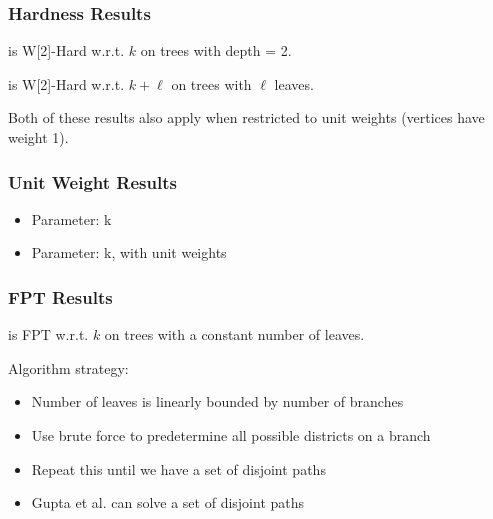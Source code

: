 \begin{frame}
    \frametitle{Hardness Results}
    \begin{theorem}
        \gm is W[2]-Hard w.r.t. $k$ on trees with depth = 2.
    \end{theorem}
    
    \vspace{1.0cm}
     {
    \begin{theorem}
        \gm is W[2]-Hard w.r.t. $k+\ell$ on trees with $\ell$ leaves.
    \end{theorem}
    }
    
    \vspace{1.0cm}
     {
        Both of these results also apply when restricted to unit weights (vertices have weight 1).
    }
    
\end{frame}

\begin{frame}
    \frametitle{Unit Weight Results} 
    \begin{itemize}
        \item Parameter: k
    \end{itemize}
	

    \begin{itemize}
        \item Parameter: k, with unit weights
    \end{itemize}
    
\end{frame}

\begin{frame}
    \frametitle{FPT Results}
    \begin{theorem}
        \gm is FPT w.r.t. $k$ on trees with a constant number of leaves.
    \end{theorem}
    
    \vspace{1.0cm}
     {
        Algorithm strategy:
        \begin{itemize}
            \item Number of leaves is linearly bounded by number of branches
            \item Use brute force to predetermine all possible districts on a branch
            \item Repeat this until we have a set of disjoint paths
            \item Gupta et al. can solve a set of disjoint paths
        \end{itemize}
    }
\end{frame}


